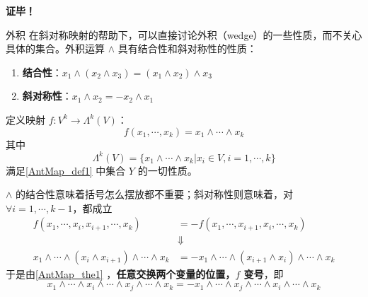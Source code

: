 \textbf{证毕！}
\begin{example}{外积}\label{AntMap_ex1}
在斜对称映射的帮助下，可以直接讨论外积（wedge）的一些性质，而不关心具体的集合。外积运算 $\wedge$ 具有结合性和斜对称性的性质：
\begin{enumerate}
\item \textbf{结合性}：$x_1\wedge(x_2\wedge x_3)=(x_1\wedge x_2)\wedge x_3$
\item \textbf{斜对称性}：$x_1\wedge x_2=-x_2\wedge x_1$
\end{enumerate}

定义映射 $f:V^k\rightarrow \Lambda^k(V)$：
\begin{equation}
f(x_1,\cdots,x_k)=x_1\wedge\cdots\wedge x_k
\end{equation}
其中
\begin{equation}
\Lambda^k(V)=\{x_1\wedge\cdots\wedge x_k| x_i\in V,i=1,\cdots,k\}
\end{equation}
满足\autoref{AntMap_def1} 中集合 $Y$ 的一切性质。

$\wedge$ 的结合性意味着括号怎么摆放都不重要；斜对称性则意味着，对 $\forall i=1,\cdots,k-1$，都成立
\begin{equation}
\begin{aligned}
f(x_1,\cdots,x_i,x_{i+1},\cdots,x_k)&=-f(x_1,\cdots,x_{i+1},x_i,\cdots,x_k)\\
&\Downarrow\\
x_1\wedge\cdots\wedge (x_i\wedge x_{i+1})\wedge\cdots\wedge x_k&=-x_1\wedge\cdots\wedge (x_{i+1}\wedge x_{i})\wedge\cdots\wedge x_k
\end{aligned}
\end{equation}
于是由\autoref{AntMap_the1} ，\textbf{任意交换两个变量的位置，$f$ 变号}，即
\begin{equation}
x_1\wedge\cdots\wedge x_i\wedge\cdots\wedge x_j\wedge\cdots\wedge x_k=-x_1\wedge\cdots\wedge x_j\wedge\cdots\wedge x_i\wedge\cdots\wedge x_k
\end{equation}


\end{example}
